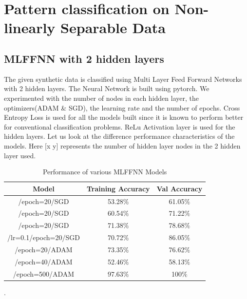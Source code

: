 \section{Pattern classification on Non-linearly Separable Data}

\subsection{MLFFNN with 2 hidden layers}

The given synthetic data is classified using Multi Layer Feed Forward Networks with 2 hidden layers. The Neural Network is built using pytorch. We experimented with the number of nodes in each hidden layer, the optimizers(ADAM \& SGD), the learning rate and the number of epochs. Cross Entropy Loss is used for all the models built since it is known to perform better for conventional classification problems. ReLu Activation layer is used for the hidden layers. Let us look at the difference performance characteristics of the models. Here [x y] represents the number of hidden layer nodes in the 2 hidden layer used.


{
\begin{table}[!h]
\centering
\begin{tabular}{ |c|c|c|  }
\hline
\rowcolor{lightgray} Model & Training Accuracy & Val Accuracy\\
\hline
[2 2]/epoch=20/SGD & 53.28$\%$  & 61.05$\%$  \\ 
\hline
[3 3]/epoch=20/SGD & 60.54$\%$  & 71.22$\%$  \\ 
\hline
[3 3]/epoch=20/SGD & 71.38$\%$  & 78.68$\%$  \\ 
\hline
[3 3]/lr=0.1/epoch=20/SGD & 70.72$\%$  & 86.05$\%$  \\ 
\hline
[3 3]/epoch=20/ADAM & 73.35$\%$  & 76.62$\%$  \\ 
\hline
[4 4]/epoch=40/ADAM & 52.46$\%$  & 58.13$\%$  \\ 
\hline
[4 4]/epoch=500/ADAM & 97.63$\%$  & 100$\%$  \\ 
\hline
\end{tabular}
\caption{Performance of various MLFFNN Models}.
\label{table:3}
\end{table}
}


